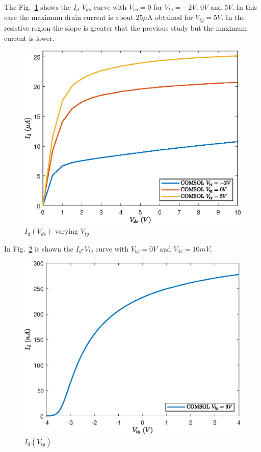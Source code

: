 \documentclass[12pt,a4paper,titlepage]{article}
\begin{document}
The Fig.~\ref{fig:HfZrO2_Id(Vd)_varying_Vtg} shows the $I_d$-$V_{ds}$ curve with $V_{bg} = 0$ for $V_{tg} = -2V$, $0V$ and $5V$. In this case the maximum drain current is about $25 \mu$A obtained for $V_{tg} = 5V$. In the resistive region the slope is greater that the previous study but the maximum current is lower.

\begin{figure}[H]
	\centering
	\includegraphics[width=.8\textwidth]{Grafici/HfZrO2_Id(Vd)_varying_Vtg.eps} 
	\caption{$I_d(V_{ds})$ varying $V_{tg}$}
	\label{fig:HfZrO2_Id(Vd)_varying_Vtg}
\end{figure} 

In Fig.~\ref{fig:HfZrO2_Id(Vtg)} is shown the $I_d$-$V_{tg}$ curve with $V_{bg}=0V$ and $V_{ds} = 10 mV$.

\begin{figure}[H]
	\centering
	\includegraphics[width=.8\textwidth]{Grafici/HfZrO2_Id(Vtg).eps} 
	\caption{$I_d(V_{tg})$}
	\label{fig:HfZrO2_Id(Vtg)}
\end{figure} 


\newpage

\nocite{*}
\printbibliography
\end{document}
